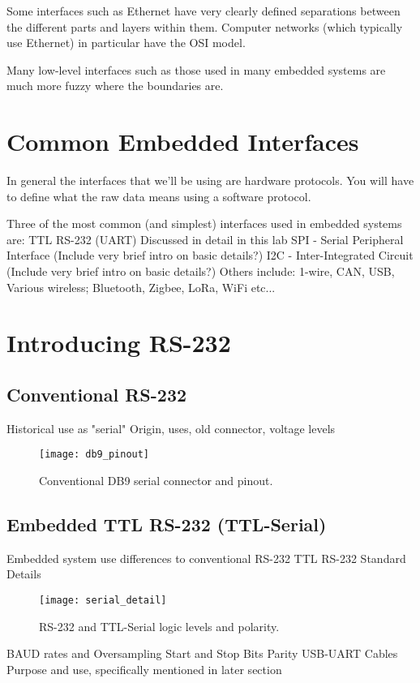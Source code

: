 \documentclass[11pt,fleqn]{book} %
\begin{document}
Some interfaces such as Ethernet have very clearly defined separations between the different parts and layers within them. Computer networks (which typically use Ethernet) in particular have the OSI model.

Many low-level interfaces such as those used in many embedded systems are much more fuzzy where the boundaries are. 


\section{Common Embedded Interfaces}	
In general the interfaces that we'll be using are hardware protocols. You will have to define what the raw data means using a software protocol.

Three of the most common (and simplest) interfaces used in embedded systems are:
TTL RS-232 (UART)
Discussed in detail in this lab
SPI - Serial Peripheral Interface (Include very brief intro on basic details?)
I2C - Inter-Integrated Circuit (Include very brief intro on basic details?)
Others include: 1-wire, CAN, USB, Various wireless; Bluetooth, Zigbee, LoRa, WiFi etc...

\section{Introducing RS-232}
\subsection{Conventional RS-232}
Historical use as "serial"
Origin, uses, old connector, voltage levels
\begin{figure}[]
    \centering\texttt{[image: db9\_pinout]}
    \caption{Conventional DB9 serial connector and pinout.}
    \label{db9_pinout}
\end{figure} 
\subsection{Embedded TTL RS-232 (TTL-Serial)}
Embedded system use
differences to conventional RS-232
TTL RS-232 Standard Details 
\begin{figure}[]
    \centering\texttt{[image: serial\_detail]}
    \caption{RS-232 and TTL-Serial logic levels and polarity.}
    \label{serial_detail}
\end{figure}
BAUD rates and Oversampling
Start and Stop Bits
Parity 
USB-UART Cables
Purpose and use, specifically mentioned in later section
\end{document}
